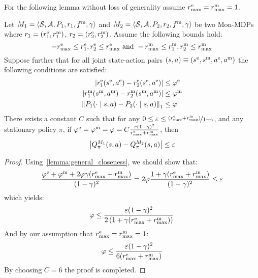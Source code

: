 %
For the following lemma without loss of generality assume $r_{\text{max}}^\text{e} = r_{\text{max}}^\text{m} = 1$.
%
\begin{lemma}
\label{lemma:tau_closeness}
    Let $M_1 = \left\langle \mathcal{S}, \mathcal{A}, P_1, r_1, f^\text{m}, \gamma \right\rangle$ and $M_2 = \left\langle \mathcal{S}, \mathcal{A}, P_2, r_2, f^\text{m}, \gamma \right\rangle$ be two Mon-MDPs where $r_1 = (r^\text{e}_1, r^\text{m}_1)$, $r_2 = (r^\text{e}_2, r^\text{m}_2)$. Assume the following bounds hold:
    \begin{equation*}
        -r_{\text{max}}^\text{e} \leq r^\text{e}_1, r^\text{e}_2 \leq r_{\text{max}}^\text{e} \text{ and } -r_{\text{max}}^\text{m} \leq r^\text{m}_1, r^\text{m}_2 \leq r_{\text{max}}^\text{m}
    \end{equation*}
    Suppose further that for all joint state-action pairs $(s, a) \equiv (s^\text{e}, s^\text{m}, a^\text{e}, a^\text{m})$ the following conditions are satisfied:
    \begin{align*}
    \left \lvert r^\text{e}_1(s^\text{e}, a^\text{e}) - r^\text{e}_2(s^\text{e}, a^\text{e}) \right \rvert & \leq \varphi^\text{e} \\
    \left \lvert r^\text{m}_1(s^\text{m}, a^\text{m}) - r^\text{m}_2(s^\text{m}, a^\text{m}) \right \rvert & \leq \varphi^\text{m} \\
    \left \lVert P_1(\cdot \mid s, a) - P_2(\cdot \mid s, a) \right \rVert_1 & \leq \varphi
    \end{align*}
    There exists a constant $C$ such that for any $0 \leq \varepsilon \leq \nicefrac{(r_{\text{max}}^\text{e} + r_{\text{max}}^\text{m})}{1 - \gamma}$, and any stationary policy $\pi$, if $\varphi^\text{e} = \varphi^\text{m} = \varphi = C\frac{\varepsilon(1 - \gamma)^2}{r_{\text{max}}^\text{e} + r_{\text{max}}^\text{m}}$, then
    \begin{equation*}
        \left \lvert Q^{M_1}_\pi(s, a) - Q^{M_2}_\pi(s, a) \right \rvert \leq \varepsilon
    \end{equation*}
\end{lemma}
%
\begin{proof}
    Using~\cref{lemma:general_closeness}, we should show that:
    \begin{equation*}
        \frac{\varphi^\text{e} + \varphi^\text{m} + 2\varphi\gamma(r_{\text{max}}^\text{e} + r_{\text{max}}^\text{m})}{(1 - \gamma)^2} = 2\varphi\frac{1 + \gamma(r_{\text{max}}^\text{e} + r_{\text{max}}^\text{m})}{(1 - \gamma)^2} \leq \varepsilon
    \end{equation*}
    which yields:
    \begin{equation*}
        \varphi \leq \frac{\varepsilon(1 - \gamma)^2}{2\left(1 + \gamma(r_{\text{max}}^\text{e} + r_{\text{max}}^\text{m})\right)}
    \end{equation*}
    And by our assumption that $r_{\text{max}}^\text{e} = r_{\text{max}}^\text{m} = 1$:
    \begin{equation*}
        \varphi \leq \frac{\varepsilon(1 - \gamma)^2}{6(r_{\text{max}}^\text{e} + r_{\text{max}}^\text{m})}
    \end{equation*}
    By choosing $C = 6$ the proof is completed. \qedhere
\end{proof}

